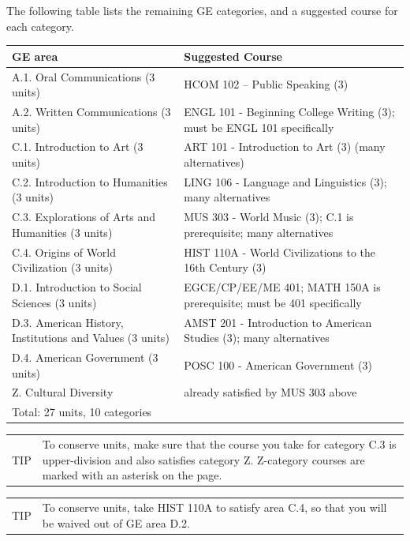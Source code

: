 \documentclass{book}
\newenvironment{tip}{
  \tcolorbox \begin{tabular}{m{.5in} m{5in}} \Large{TIP} &
}{
  \end{tabular} \endtcolorbox
}
\begin{document}
The following table lists the remaining GE categories, and a suggested course for each category.

\begin{center}
\begin{tabular}{| p{3in} | p{3in} |} \hline
  \textbf{GE area} & \textbf{Suggested Course} \\ \hline
  A.1. Oral Communications (3 units) & HCOM 102 – Public Speaking (3) \\ \hline
  A.2. Written Communications (3 units) & ENGL 101 - Beginning College Writing (3); must be ENGL 101 specifically \\ \hline
  C.1. Introduction to Art (3 units) & ART 101 - Introduction to Art (3) (many alternatives) \\ \hline
  C.2. Introduction to Humanities (3 units) & LING 106 - Language and Linguistics (3); many alternatives \\ \hline
  C.3. Explorations of Arts and Humanities (3 units) & MUS 303 - World Music (3); C.1 is prerequisite; many alternatives \\ \hline
  C.4. Origins of World Civilization (3 units) & HIST 110A - World Civilizations to the 16th Century (3) \\ \hline
  D.1. Introduction to Social Sciences (3 units) & EGCE/CP/EE/ME 401; MATH 150A is prerequisite; must be 401 specifically \\ \hline
  D.3. American History, Institutions and Values (3 units) & AMST 201 - Introduction to American Studies (3); many alternatives \\ \hline
  D.4. American Government (3 units) & POSC 100 - American Government (3) \\ \hline
  Z. Cultural Diversity & already satisfied by MUS 303 above \\ \hline
  \multicolumn{2}{|l|}{Total: 27 units, 10 categories} \\ \hline
\end{tabular}
\end{center}

\begin{tip}
To conserve units, make sure that the course you take for category C.3 is upper-division and also satisfies category Z. Z-category courses are marked with an asterisk on the \gecourselist page.
\end{tip}

\begin{tip}
  To conserve units, take HIST 110A to satisfy area C.4, so that you will be waived out of GE area D.2.
  \end{tip}
\end{document}
